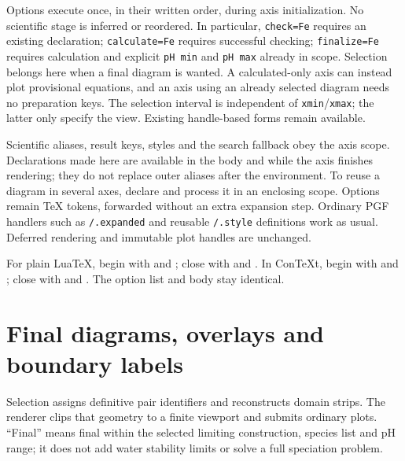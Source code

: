\documentclass[a4paper,11pt]{ltxdoc}
\begin{document}
Options execute once, in their written order, during axis initialization.
No scientific stage is inferred or reordered. In particular, \texttt{check=Fe}
requires an existing declaration; \texttt{calculate=Fe} requires successful
checking; \texttt{finalize=Fe} requires calculation and explicit \texttt{pH min}
and \texttt{pH max} already in scope. Selection belongs here when a final diagram
is wanted. A calculated-only axis can instead plot provisional equations, and
an axis using an already selected diagram needs no preparation keys.
The selection interval is independent of \texttt{xmin}/\texttt{xmax}; the latter
only specify the view. Existing handle-based forms remain available.

Scientific aliases, result keys, styles and the search fallback obey the axis
scope. Declarations made here are available in the body and while the axis
finishes rendering; they do not replace outer aliases after the environment.
To reuse a diagram in several axes, declare and process it in an enclosing scope.
Options remain TeX tokens, forwarded without an extra expansion step. Ordinary
PGF handlers such as \texttt{/.expanded} and reusable \texttt{/.style} definitions
work as usual. Deferred rendering and immutable plot handles are unchanged.

\begin{codeexample}[width=9cm]
\end{codeexample}
For plain LuaTeX, begin with  and ; close with
 and .
In ConTeXt, begin with  and ; close with
 and . The option list and body stay identical.

\section{Final diagrams, overlays and boundary labels}
\label{sec:rendering}
Selection assigns definitive pair identifiers and reconstructs domain strips.
The renderer clips that geometry to a finite viewport and submits ordinary plots.
``Final'' means final within the selected limiting construction, species list and
pH range; it does not add water stability limits or solve a full speciation problem.
\end{document}
